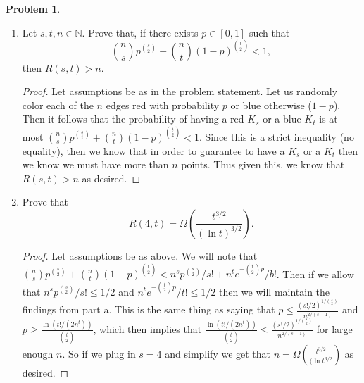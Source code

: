 \documentclass[11pt]{amsart}
\theoremstyle{definition}
\newtheorem{problem}{Problem}[]
\begin{document}
\clearpage
\begin{problem}~
  \begin{enumerate}[label={(\alph*)}]
  \item Let $s, t, n \in \mathbb N$.  Prove that, if there exists $p \in [0, 1]$ such that
    \begin{equation*}
      \binom{n}{s}p^{\binom{s}{2}} + \binom{n}{t}(1 - p)^{\binom{t}{2}} < 1,
      \end{equation*}
      then $R(s, t) > n$.

\begin{proof}
    Let assumptions be as in the problem statement. Let us randomly color each of the $n$ edges red with probability $p$ or blue otherwise ($1-p$). Then it follows that the probability of having a red $K_s$ or a blue $K_t$ is at most $\binom{n}{s}p^{\binom{s}{t}} + \binom{n}{t}(1-p)^{\binom{t}{2}} < 1$. Since this is a strict inequality (no equality), then we know that in order to guarantee to have a $K_s$ or a $K_t$ then we know we must have more than $n$ points. Thus given this, we know that $R(s, t) > n$ as desired.
\end{proof}
      
    \item Prove that
      \begin{equation*}
        R(4, t) = \Omega\left(\frac{t^{3/2}}{(\ln t)^{3/2}}\right).
      \end{equation*}

\begin{proof}
    Let assumptions be as above. We will note that $\binom{n}{s}p^{\binom{s}{2}} + \binom{n}{t}(1-p)^{\binom{t}{2}} < n^sp^{\binom{s}{2}}/s! + n^te^{-\binom{t}{2}p}/b!$. Then if we allow that $n^sp^{\binom{s}{2}}/s!\leq 1/2$ and $n^te^{-\binom{t}{2}p}/t! \leq 1/2$ then we will maintain the findings from part a. This is the same thing as saying that $p \leq \frac{(s!/2)^{1/\binom{s}{2}}}{n^{2/(s - 1)}}$ and $p \geq \frac{\ln(t!/(2n^t))}{\binom{t}{2}}$, which then implies that $\frac{\ln(t!/(2n^t))}{\binom{t}{2}} \leq \frac{(s!/2)^{1/\binom{s}{2}}}{n^{2/(s - 1)}}$ for large enough $n.$ So if we plug in $s = 4$ and simplify we get that $n = \Omega\left(\frac{t^{3/2}}{(\ln{t}^{3/2}}\right)$ as desired.
\end{proof}
      
  \end{enumerate}
\end{problem}
\end{document}
